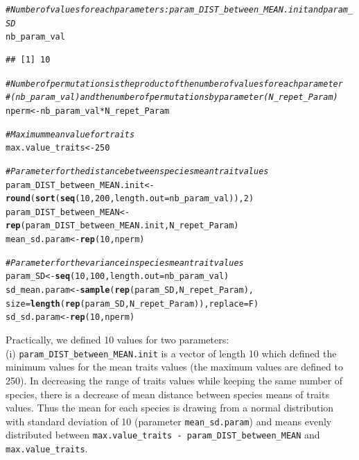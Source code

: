 \documentclass[12pt]{article}\usepackage[]{graphicx}\usepackage[]{color}
\makeatletter
\newcommand{\hlnum}[1]{\textcolor[rgb]{0.686,0.059,0.569}{#1}}%
\newcommand{\hlcom}[1]{\textcolor[rgb]{0.678,0.584,0.686}{\textit{#1}}}%
\newcommand{\hlopt}[1]{\textcolor[rgb]{0,0,0}{#1}}%
\newcommand{\hlstd}[1]{\textcolor[rgb]{0.345,0.345,0.345}{#1}}%
\newcommand{\hlkwb}[1]{\textcolor[rgb]{0.69,0.353,0.396}{#1}}%
\newcommand{\hlkwc}[1]{\textcolor[rgb]{0.333,0.667,0.333}{#1}}%
\newcommand{\hlkwd}[1]{\textcolor[rgb]{0.737,0.353,0.396}{\textbf{#1}}}%
\newenvironment{kframe}{%
 \def\at@end@of@kframe{}%
 \ifinner\ifhmode%
  \def\at@end@of@kframe{\end{minipage}}%
  \begin{minipage}{\columnwidth}%
 \fi\fi%
 \def\FrameCommand##1{\hskip\@totalleftmargin \hskip-\fboxsep
 \colorbox{shadecolor}{##1}\hskip-\fboxsep
     \hskip-\linewidth \hskip-\@totalleftmargin \hskip\columnwidth}%
 \MakeFramed {\advance\hsize-\width
   \@totalleftmargin\z@ \linewidth\hsize
   \@setminipage}}%
 {\par\unskip\endMakeFramed%
 \at@end@of@kframe}
\newenvironment{knitrout}{}{} %
\makeatother
\begin{document}
\begin{knitrout}\small
{}\color{fgcolor}\begin{kframe}
\begin{alltt}
\hlcom{# Number of values for each parameters: param_DIST_between_MEAN.init and param_SD}
\hlstd{nb_param_val}
\end{alltt}
\begin{verbatim}
## [1] 10
\end{verbatim}
\begin{alltt}
\hlcom{# Number of permutations is the product of the number of values for each parameter}
\hlcom{#(nb_param_val) and the number of permutations by parameter (N_repet_Param)}
\hlstd{nperm} \hlkwb{<-} \hlstd{nb_param_val} \hlopt{*} \hlstd{N_repet_Param}

\hlcom{# Maximum mean value for traits}
\hlstd{max.value_traits} \hlkwb{<-} \hlnum{250}

\hlcom{# Parameter for the distance between species mean trait values}
\hlstd{param_DIST_between_MEAN.init} \hlkwb{<-} \hlkwd{round}\hlstd{(}\hlkwd{sort}\hlstd{(}\hlkwd{seq}\hlstd{(}\hlnum{10}\hlstd{,} \hlnum{200}\hlstd{,} \hlkwc{length.out} \hlstd{= nb_param_val)),} \hlnum{2}\hlstd{)}
\hlstd{param_DIST_between_MEAN} \hlkwb{<-} \hlkwd{rep}\hlstd{(param_DIST_between_MEAN.init, N_repet_Param)}
\hlstd{mean_sd.param} \hlkwb{<-} \hlkwd{rep}\hlstd{(}\hlnum{10}\hlstd{, nperm)}

\hlcom{# Parameter for the variance in species mean trait values}
\hlstd{param_SD} \hlkwb{<-} \hlkwd{seq}\hlstd{(}\hlnum{10}\hlstd{,} \hlnum{100}\hlstd{,}\hlkwc{length.out} \hlstd{= nb_param_val)}
\hlstd{sd_mean.param} \hlkwb{<-} \hlkwd{sample} \hlstd{(}\hlkwd{rep}\hlstd{(param_SD, N_repet_Param),}
       \hlkwc{size} \hlstd{=} \hlkwd{length}\hlstd{(}\hlkwd{rep}\hlstd{(param_SD, N_repet_Param)),} \hlkwc{replace} \hlstd{= F)}
\hlstd{sd_sd.param} \hlkwb{<-} \hlkwd{rep}\hlstd{(}\hlnum{10}\hlstd{, nperm)}
\end{alltt}
\end{kframe}
\end{knitrout}


 Practically, we defined 10 values for two parameters:
\\

 (i) \texttt{param\_{}DIST\_{}between\_{}MEAN.init} is a vector of length 10 which defined the minimum values for the mean traits values (the maximum values are defined to 250). In decreasing the range of traits values while keeping the same number of species, there is a decrease of mean distance between species means of traits values. Thus the mean for each species is drawing from a normal distribution with standard deviation of 10 (parameter \texttt{mean\_{}sd.param}) and means evenly distributed between \texttt{max.value\_{}traits - param\_{}DIST\_{}between\_{}MEAN} and \texttt{max.value\_{}traits}.
\\
\end{document}
